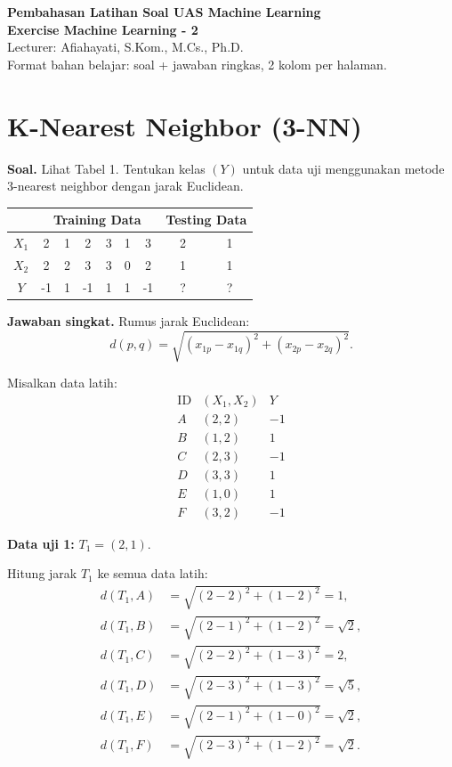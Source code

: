 \documentclass[a4paper,10pt,twocolumn]{article}
\newcommand{\soal}[1]{\textbf{Soal.} #1}
\newcommand{\jawab}{\textbf{Jawaban singkat.} }
\begin{document}
\begin{center}
    {\Large \textbf{Pembahasan Latihan Soal UAS Machine Learning}}\\[-1pt]
    {\large \textbf{Exercise Machine Learning - 2}}\\
    Lecturer: Afiahayati, S.Kom., M.Cs., Ph.D.\\
    \vspace{2pt}
    \small Format bahan belajar: soal + jawaban ringkas, 2 kolom per halaman.
\end{center}

\section{K-Nearest Neighbor (3-NN)}

\soal{Lihat Tabel 1. Tentukan kelas $(Y)$ untuk data uji menggunakan metode 3-nearest neighbor dengan jarak Euclidean.}

\begin{center}
\scriptsize
\begin{tabular}{c|cccccc|cc}
\toprule
 & \multicolumn{6}{c|}{Training Data} & \multicolumn{2}{c}{Testing Data} \\
\midrule
$X_1$ & 2 & 1 & 2 & 3 & 1 & 3 & 2 & 1 \\
$X_2$ & 2 & 2 & 3 & 3 & 0 & 2 & 1 & 1 \\
$Y$   & -1 & 1 & -1 & 1 & 1 & -1 & ? & ? \\
\bottomrule
\end{tabular}
\end{center}

\jawab
Rumus jarak Euclidean:
\[
d(p,q)=\sqrt{(x_{1p}-x_{1q})^2+(x_{2p}-x_{2q})^2}.
\]

Misalkan data latih:
\[
\begin{array}{c|c|c}
\text{ID} & (X_1,X_2) & Y \\
\hline
A&(2,2)&-1\\
B&(1,2)&1\\
C&(2,3)&-1\\
D&(3,3)&1\\
E&(1,0)&1\\
F&(3,2)&-1
\end{array}
\]

\textbf{Data uji 1:} $T_1=(2,1)$.

Hitung jarak $T_1$ ke semua data latih:
\[
\begin{aligned}
d(T_1,A)&=\sqrt{(2-2)^2+(1-2)^2}=1,\\
d(T_1,B)&=\sqrt{(2-1)^2+(1-2)^2}=\sqrt2,\\
d(T_1,C)&=\sqrt{(2-2)^2+(1-3)^2}=2,\\
d(T_1,D)&=\sqrt{(2-3)^2+(1-3)^2}=\sqrt5,\\
d(T_1,E)&=\sqrt{(2-1)^2+(1-0)^2}=\sqrt2,\\
d(T_1,F)&=\sqrt{(2-3)^2+(1-2)^2}=\sqrt2.
\end{aligned}
\]
\end{document}
